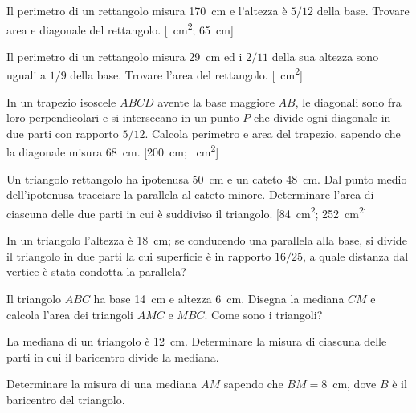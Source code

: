 \begin{multicols}{2}
\begin{esercizio}
\label{ese:7.69}
Il perimetro di un rettangolo misura 170~cm e l'altezza è $5/12$ della base. Trovare area e diagonale del rettangolo.
[~cm\textsuperscript{2}; 65~cm]
\end{esercizio}

\begin{esercizio}
\label{ese:7.70}
Il perimetro di un rettangolo misura 29~cm ed i $2/11$ della sua altezza sono uguali a $1/9$ della base. Trovare l'area del rettangolo.
[~cm\textsuperscript{2}]
\end{esercizio}

\begin{esercizio}
\label{ese:7.71}
In un trapezio isoscele $ABCD$ avente la base maggiore $AB$, le diagonali sono fra loro perpendicolari e si intersecano in un punto $P$ che divide ogni diagonale in due parti con rapporto $5/12$. Calcola perimetro e area del trapezio, sapendo che la diagonale misura 68~cm.
[200~cm; ~cm\textsuperscript{2}]
\end{esercizio}

\begin{esercizio}
\label{ese:7.72}
Un triangolo rettangolo ha ipotenusa 50~cm e un cateto 48~cm. Dal punto medio dell'ipotenusa tracciare la parallela al cateto minore. Determinare l'area di ciascuna delle due parti in cui è suddiviso il triangolo.
[84~cm\textsuperscript{2}; 252~cm\textsuperscript{2}]
\end{esercizio}

\begin{esercizio}
\label{ese:7.73}
In un triangolo l'altezza è 18~cm; se conducendo una parallela alla base, si divide il triangolo in due parti la cui superficie è in rapporto $16/25$, a quale distanza dal vertice è stata condotta la parallela?
\end{esercizio}

\begin{esercizio}
\label{ese:7.74}
Il triangolo $ABC$ ha base 14~cm e altezza 6~cm. Disegna la mediana $CM$ e calcola l'area dei triangoli $AMC$ e $MBC$. Come sono i triangoli?
\end{esercizio}

\begin{esercizio}
\label{ese:7.75}
La mediana di un triangolo è 12~cm. Determinare la misura di ciascuna delle parti in cui il baricentro divide la mediana.
\end{esercizio}

\begin{esercizio}
\label{ese:7.76}
Determinare la misura di una mediana $AM$ sapendo che $BM=8$~cm, dove $B$ è il baricentro del triangolo.
\end{esercizio}


\end{multicols}
